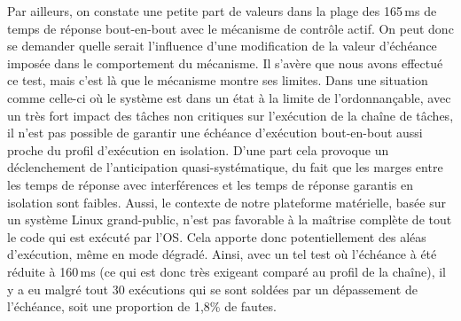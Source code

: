 \documentclass[french, a4paper, 11pt, twoside, pdftex]{StyleThese}
\begin{document}
Par ailleurs, on constate une petite part de valeurs dans la plage des 165\,ms de temps de réponse bout-en-bout avec le mécanisme de contrôle actif. On peut donc se demander quelle serait l'influence d'une modification de la valeur d'échéance imposée dans le comportement du mécanisme. Il s'avère que nous avons effectué ce test, mais c'est là que le mécanisme montre ses limites. Dans une situation comme celle-ci où le système est dans un état à la limite de l'ordonnançable, avec un très fort impact des tâches non critiques sur l'exécution de la chaîne de tâches, il n'est pas possible de garantir une échéance d'exécution bout-en-bout aussi proche du profil d'exécution en isolation. D'une part cela provoque un déclenchement de l'anticipation quasi-systématique, du fait que les marges entre les temps de réponse avec interférences et les temps de réponse garantis en isolation sont faibles. Aussi, le contexte de notre plateforme matérielle, basée sur un système Linux grand-public, n'est pas favorable à la maîtrise complète de tout le code qui est exécuté par l'OS. Cela apporte donc potentiellement des aléas d'exécution, même en mode dégradé.
Ainsi, avec un tel test où l'échéance à été réduite à 160\,ms (ce qui est donc très exigeant comparé au profil de la chaîne), il y a eu malgré tout 30 exécutions qui se sont soldées par un dépassement de l'échéance, soit une proportion de 1,8\% de fautes.




\ifdefined{}
\else


\end{document}
